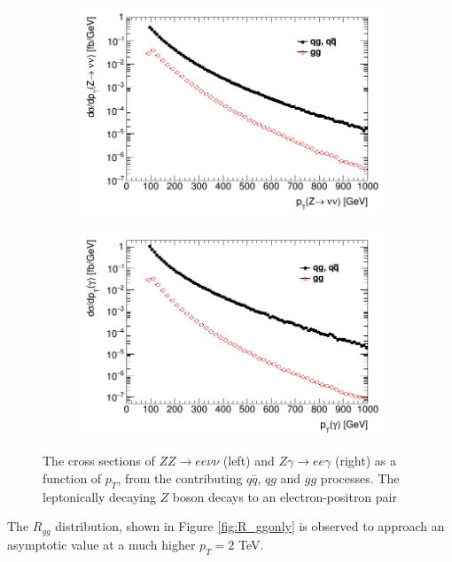 \documentclass[12pt,a4paper,openright,twoside]{report}
\begin{document}
\begin{figure}[H]
\centering
	\begin{subfigure}{0.49\textwidth}
		\includegraphics[width=\linewidth]{ZZ_subproc.png}
	\end{subfigure}
	\begin{subfigure}{0.49\textwidth}
		\includegraphics[width=\linewidth]{Zg_subproc.png}
	\end{subfigure}	
\caption{The cross sections of $ZZ\to ee\nu\nu$ (left) and $Z\gamma\to ee\gamma$ (right) as a function of $p_T$, from the contributing $q\bar{q}$, $qg$ and $gg$ processes. The leptonically decaying $Z$ boson decays to an electron-positron pair}
\label{fig:xsec_gg_qq}
\end{figure}

The $R_{gg}$ distribution, shown in Figure \ref{fig:R_ggonly} is observed to approach an asymptotic value at a much higher $p_T = 2$ TeV.
\end{document}

